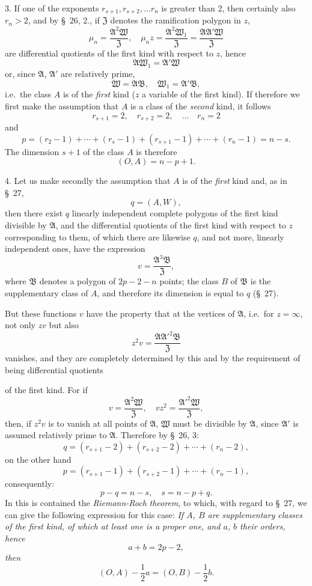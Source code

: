 \documentclass{article}
\begin{document}
3. If one of the exponents $r_{s+1}, r_{s+2}, \ldots r_{n}$ is greater than 2, then certainly also $r_{n} > 2$, and by §~26, 2., if $\mathfrak{Z}$ denotes the ramification polygon in $z$,
\[ \mu_{n} = \frac{\mathfrak{A}^{2}\mathfrak{W}}{\mathfrak{Z}}, \quad \mu_{n}z = \frac{\mathfrak{A}^{2}\mathfrak{W}_{1}}{\mathfrak{Z}} = \frac{\mathfrak{A}\mathfrak{A}'\mathfrak{W}}{\mathfrak{Z}} \]
are differential quotients of the first kind with respect to $z$, hence
\[ \mathfrak{A}\mathfrak{W}_{1} = \mathfrak{A}'\mathfrak{W} \]
or, since $\mathfrak{A}$, $\mathfrak{A}'$ are relatively prime,
\[ \mathfrak{W} = \mathfrak{A}\mathfrak{B}, \quad \mathfrak{W}_{1} = \mathfrak{A}'\mathfrak{B}, \]
i.e.\ the class $A$ is of the \emph{first} kind ($z$ a variable of the first kind). If therefore we first make the assumption that $A$ is a class of the \emph{second} kind, it follows
\[ r_{s+1} = 2, \quad r_{s+2} = 2, \quad \ldots \quad r_{n} = 2 \]
and
\[ p = (r_{2}-1) + \cdots + (r_{s}-1) + (r_{s+1}-1) + \cdots + (r_{n}-1) = n-s. \]
The dimension $s+1$ of the class $A$ is therefore
\[ (O, A) = n-p+1. \]

4. Let us make secondly the assumption that $A$ is of the \emph{first} kind and, as in §~27,
\[ q = (A, W), \]
then there exist $q$ linearly independent complete polygons of the first kind divisible by $\mathfrak{A}$, and the differential quotients of the first kind with respect to $z$ corresponding to them, of which there are likewise $q$, and not more, linearly independent ones, have the expression
\[ v = \frac{\mathfrak{A}^{3}\mathfrak{B}}{\mathfrak{Z}}, \]
where $\mathfrak{B}$ denotes a polygon of $2p-2-n$ points; the class $B$ of $\mathfrak{B}$ is the supplementary class of $A$, and therefore its dimension is equal to $q$ (§~27).

But these functions $v$ have the property that at the vertices of $\mathfrak{A}$, i.e.\ for $z = \infty$, not only $zv$ but also
\[ z^{2}v = \frac{\mathfrak{A}\mathfrak{A}'^{2}\mathfrak{B}}{\mathfrak{Z}} \]
vanishes, and they are completely determined by this and by the requirement of being differential quotients

of the first kind. For if
\[ v = \frac{\mathfrak{A}^{2}\mathfrak{W}}{\mathfrak{Z}}, \quad vz^{2} = \frac{\mathfrak{A}'^{2}\mathfrak{W}}{\mathfrak{Z}}, \]
then, if $z^{2}v$ is to vanish at all points of $\mathfrak{A}$, $\mathfrak{W}$ must be divisible by $\mathfrak{A}$, since $\mathfrak{A}'$ is assumed relatively prime to $\mathfrak{A}$. Therefore by §~26, 3:
\[ q = (r_{s+1}-2)+(r_{s+2}-2)+\cdots+(r_{n}-2), \]
on the other hand
\[ p = (r_{s+1}-1)+(r_{s+2}-1)+\cdots+(r_{n}-1), \]
consequently:
\[ p-q = n-s, \quad s = n-p+q. \]
In this is contained the \emph{Riemann-Roch} \emph{theorem}, to which, with regard to §~27, we can give the following expression for this case: \emph{If $A$, $B$ are supplementary classes of the first kind, of which at least one is a proper one, and $a$, $b$ their orders, hence}
\[ a+b = 2p-2, \]
\emph{then}
\[ (O, A)-\frac{1}{2}a = (O, B)-\frac{1}{2}b. \]
\end{document}

